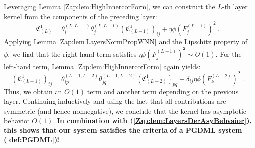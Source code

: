 \documentclass{article} %
\begin{document}
Leveraging Lemma \ref{Zap:lem:HighInnercorForm}, we can construct the \(L\)-th layer kernel from the components of the preceding layer:
\begin{equation}
\mathfrak{C}_{\left(L\right)}^{1}=\theta_{i}^{\left(L,L-1\right)}\theta_{j}^{\left(L,L-1\right)}\left(\mathfrak{C}_{\left(L-1\right)}^{1}\right)_{ij}+\eta\phi\left(F_{j}^{\left(L-1\right)}\right)^{2} \ .
\label{eq:MiaH}
\end{equation}
Applying Lemma \ref{Zap:lem:LayersNormPropWNN} and the Lipschitz property of \(\phi\), we find that the right-hand term satisfies \(\eta\phi\left(F_{j}^{\left(L-1\right)}\right)^{2}\sim O\left(1\right)\). For the left-hand term, Lemma \ref{Zap:lem:HighInnercorForm} again yields:
\begin{equation}
\left(\mathfrak{C}_{\left(L-1\right)}^{1}\right)_{ij}=\theta_{ip}^{\left(L-1,L-2\right)}\theta_{jq}^{\left(L-1,L-2\right)}\left(\mathfrak{C}_{\left(L-2\right)}^{1}\right)_{pq}+\delta_{ij}\eta\phi\left(F_{k}^{\left(L-2\right)}\right)^{2} \ .
\end{equation}
Thus, we obtain an \(O(1)\) term and another term depending on the previous layer. Continuing inductively and using the fact that all contributions are symmetric (and hence nonnegative), we conclude that the kernel has asymptotic behavior \(O(1)\). \textbf{In combination with (\ref{Zap:lem:LayersDerAsyBehvaior}), this shows that our system satisfies the criteria of a PGDML system (\ref{def:PGDML})!}
\end{document}
